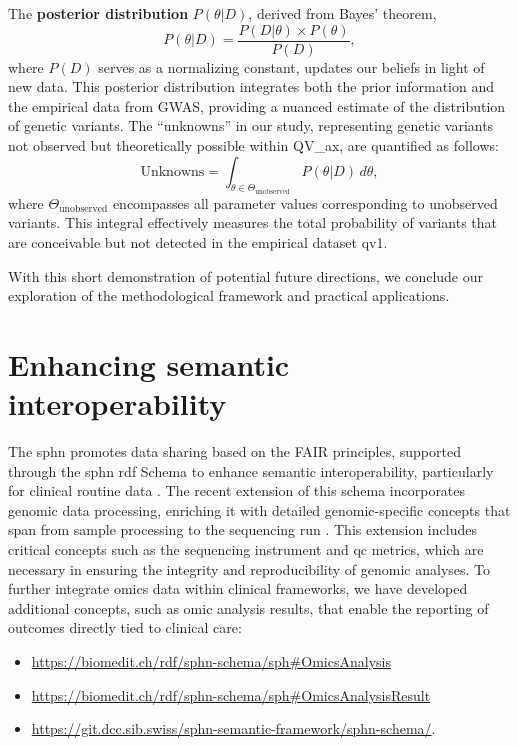 The \textbf{posterior distribution} \( P(\theta|D) \), derived from Bayes' theorem,
$$P(\theta|D) = \frac{P(D|\theta) \times P(\theta)}{P(D)},$$
where \( P(D) \) serves as a normalizing constant, updates our beliefs in light of new data. This posterior distribution integrates both the prior information and the empirical data from GWAS, providing a nuanced estimate of the distribution of genetic variants.
The ``unknowns'' in our study, representing genetic variants not observed but theoretically possible within QV\_ax, are quantified as follows:
$$
\text{Unknowns} = \int_{\theta \in \Theta_{\text{unobserved}}} P(\theta|D) \, d\theta,
$$
where \( \Theta_{\text{unobserved}} \) encompasses all parameter values corresponding to unobserved variants. 
This integral effectively measures the total probability of variants that are conceivable but not detected in the empirical dataset \ac{qv}1.

With this short demonstration of potential future directions, we conclude our exploration of the methodological framework and practical applications.

\section{Enhancing semantic interoperability}
The \ac{sphn} promotes data sharing based on the FAIR principles, supported through the \ac{sphn} \ac{rdf} Schema to enhance semantic interoperability, particularly for clinical routine data
\cite{wilkinson2016fair, toure2023fairification}. 
The recent extension of this schema incorporates genomic data processing, enriching it with detailed genomic-specific concepts that span from sample processing to the sequencing run \cite{van2023bridging}.
This extension includes critical concepts such as the sequencing instrument and \ac{qc} metrics, which are necessary in ensuring the integrity and reproducibility of genomic analyses. To further integrate omics data within clinical frameworks, we have developed additional concepts, such as omic analysis results, that enable the reporting of outcomes directly tied to clinical care:
\begin{itemize}
\item \url{https://biomedit.ch/rdf/sphn-schema/sph#OmicsAnalysis}
\item \url{https://biomedit.ch/rdf/sphn-schema/sph#OmicsAnalysisResult}
\item \url{https://git.dcc.sib.swiss/sphn-semantic-framework/sphn-schema/}.
\end{itemize}

